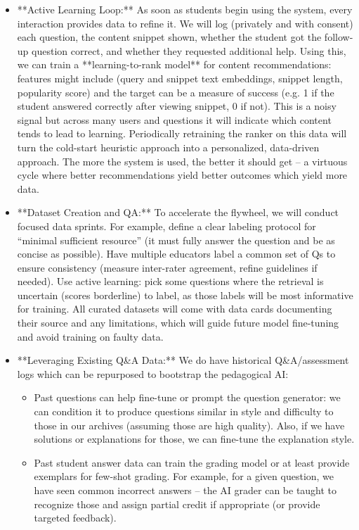 \documentclass[11pt]{article}
\begin{document}
\begin{itemize}
  \item **Active Learning Loop:** As soon as students begin using the system, every interaction provides data to refine it. We will log (privately and with consent) each question, the content snippet shown, whether the student got the follow-up question correct, and whether they requested additional help. Using this, we can train a **learning-to-rank model** for content recommendations: features might include (query and snippet text embeddings, snippet length, popularity score) and the target can be a measure of success (e.g. 1 if the student answered correctly after viewing snippet, 0 if not). This is a noisy signal but across many users and questions it will indicate which content tends to lead to learning. Periodically retraining the ranker on this data will turn the cold-start heuristic approach into a personalized, data-driven approach. The more the system is used, the better it should get – a virtuous cycle where better recommendations yield better outcomes which yield more data.
  \item **Dataset Creation and QA:** To accelerate the flywheel, we will conduct focused data sprints. For example, define a clear labeling protocol for “minimal sufficient resource” (it must fully answer the question and be as concise as possible). Have multiple educators label a common set of Qs to ensure consistency (measure inter-rater agreement, refine guidelines if needed). Use active learning: pick some questions where the retrieval is uncertain (scores borderline) to label, as those labels will be most informative for training. All curated datasets will come with data cards documenting their source and any limitations, which will guide future model fine-tuning and avoid training on faulty data.
  \item **Leveraging Existing Q\&A Data:** We do have historical Q\&A/assessment logs which can be repurposed to bootstrap the pedagogical AI:
    \begin{itemize}
      \item Past questions can help fine-tune or prompt the question generator: we can condition it to produce questions similar in style and difficulty to those in our archives (assuming those are high quality). Also, if we have solutions or explanations for those, we can fine-tune the explanation style.
      \item Past student answer data can train the grading model or at least provide exemplars for few-shot grading. For example, for a given question, we have seen common incorrect answers – the AI grader can be taught to recognize those and assign partial credit if appropriate (or provide targeted feedback).

\end{itemize}
\end{itemize}
\end{document}
